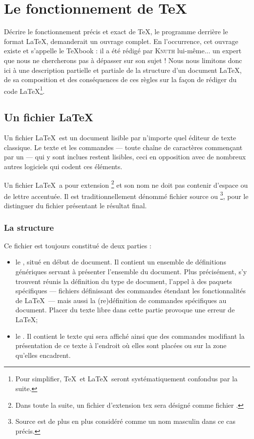 
\chapter{Le fonctionnement de \TeX}
\mtcaddchapter

Décrire le fonctionnement précis et exact de \TeX, le programme derrière le format \LaTeX, demanderait un ouvrage complet. En l'occurrence, cet ouvrage existe et s'appelle le \TeX book\cite{knut} : il a été rédigé par \textsc{Knuth} lui-même... un expert que nous ne chercherons pas à dépasser sur son sujet ! Nous nous limitons donc ici à une description partielle et partiale de la structure d'un document \LaTeX, de sa composition et des conséquences de ces règles sur la façon de rédiger du code \LaTeX\footnote{Pour simplifier, \TeX\ et \LaTeX\ seront systématiquement confondus par la suite.}.


\section{Un fichier \LaTeX}

Un fichier \LaTeX\ est un document lisible par n'importe quel éditeur de texte classique. Le texte et les commandes --- toute chaîne de caractères commençant par un \og \macro{} \fg{} --- qui y sont inclues restent lisibles, ceci en opposition avec de nombreux autres logiciels qui codent ces éléments. 

Un fichier \LaTeX\ a pour extension \footnote{Dans toute la suite, un \og fichier d'extension tex \fg{} sera désigné comme \og fichier  \fg{}.} et son nom ne doit pas contenir d'espace ou de lettre accentuée. Il est traditionnellement dénommé fichier source ou \footnote{Source est de plus en plus considéré comme un nom masculin dans ce cas précis.}, pour le distinguer du fichier présentant le résultat final.



\subsection{La structure}

Ce fichier est toujours constitué de deux parties : 
\begin{itemize}
\item le , situé en début de document. Il contient un ensemble de définitions génériques servant à présenter l'ensemble du document. Plus précisément, s'y trouvent réunis la définition du type de document, l'appel à des paquets spécifiques --- fichiers définissant des commandes étendant les fonctionnalités de \LaTeX\ --- mais aussi la (re)définition de commandes spécifiques au document. Placer du texte libre dans cette partie provoque une erreur de \LaTeX ; 
\item le . Il contient le texte qui sera affiché ainsi que des commandes modifiant la présentation de ce texte à l'endroit où elles sont placées ou sur la zone qu'elles encadrent. \\
\end{itemize}


